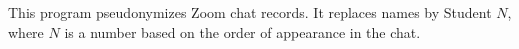 This program pseudonymizes Zoom chat records.
It replaces names by Student \(N\), where \(N\) is a number based on the order 
of appearance in the chat.
